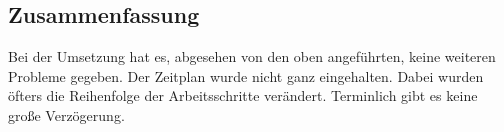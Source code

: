 \subsection{Zusammenfassung}
Bei der Umsetzung hat es, abgesehen von den oben angeführten, keine weiteren Probleme gegeben. Der Zeitplan wurde nicht ganz eingehalten. Dabei wurden öfters die Reihenfolge der Arbeitsschritte verändert. Terminlich gibt es keine große Verzögerung.